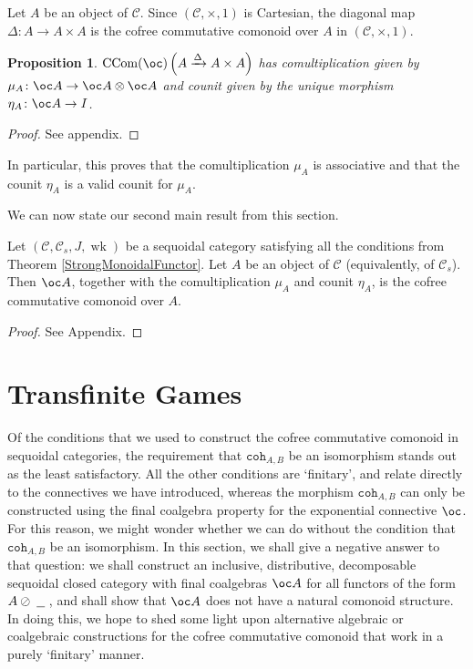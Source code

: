 \documentclass[a4paper,UKenglish]{lipics-v2016}
\theoremstyle{plain}
\newtheorem{proposition}[theorem]{Proposition}
\theoremstyle{definition}
\newcommand*\from{\colon}
\newcommand{\tensor}{\otimes}
\newcommand{\sequoid}{\oslash}
\newcommand{\C}{\mathcal C}
\newcommand{\blank}{\;\underline{\hspace{1.5ex}}\;}
\DeclareMathOperator{\wk}{wk}
\renewcommand{\int}{{\mathtt{coh}}}
\DeclareMathOperator{\CCom}{CCom}
\newlength{\arrow}
\begin{document}
Let $A$ be an object of $\C$.  Since $(\C, \times, 1)$ is Cartesian, the diagonal map $\Delta\from A\to A\times A$ is the cofree commutative comonoid over $A$ in $(\C,\times,1)$.  

\begin{proposition}\label{itsMu}
  $\CCom(\oc)\left(A\xrightarrow{\Delta}A\times A\right)$ has comultiplication given by $\mu_A\from\oc A \to \oc A\tensor\oc A$ and counit given by the unique morphism $\eta_A\from \oc A \to I$.
\end{proposition}
\begin{proof}
  See appendix.
\end{proof}

In particular, this proves that the comultiplication $\mu_A$ is associative and that the counit $\eta_A$ is a valid counit for $\mu_A$.

We can now state our second main result from this section.

\begin{theorem}
  \label{Coalgebra__CoCoCo}
  Let $(\C,\C_s,J,\wk)$ be a sequoidal category satisfying all the conditions from Theorem \ref{StrongMonoidalFunctor}.  Let $A$ be an object of $\C$ (equivalently, of $\C_s$).  Then $\oc A$, together with the comultiplication $\mu_A$ and counit $\eta_A$, is the cofree commutative comonoid over $A$.
\end{theorem}

\begin{proof}
  See Appendix.
\end{proof}

\section{Transfinite Games}

Of the conditions that we used to construct the cofree commutative comonoid in sequoidal categories, the requirement that $\int_{A,B}$ be an isomorphism stands out as the least satisfactory.  All the other conditions are `finitary', and relate directly to the connectives we have introduced, whereas the morphism $\int_{A,B}$ can only be constructed using the final coalgebra property for the exponential connective $\oc$.  For this reason, we might wonder whether we can do without the condition that $\int_{A,B}$ be an isomorphism.  In this section, we shall give a negative answer to that question: we shall construct an inclusive, distributive, decomposable sequoidal closed category with final coalgebras $\oc A$ for all functors of the form $A\sequoid\blank$, and shall show that $\oc A$ does not have a natural comonoid structure.  In doing this, we hope to shed some light upon alternative algebraic or coalgebraic constructions for the cofree commutative comonoid that work in a purely `finitary' manner.
\end{document}
